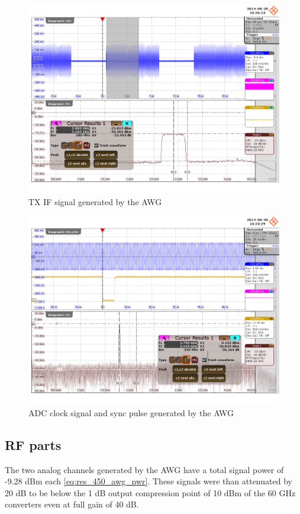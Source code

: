 \begin{figure}[p]
  \centering
  \includegraphics[width=\textwidth]{figures/osci/res_450_awg_analog}
  \caption{\gls{TX} \gls{IF} signal generated by the \gls{AWG}}
  \label{fig:res_450_awg_analog}
\end{figure}

\begin{figure}[p]
  \centering
  \includegraphics[width=\textwidth]{figures/osci/res_450_awg_digital}
  \caption{\gls{ADC} clock signal and sync pulse generated by the \gls{AWG}}
  \label{fig:res_450_awg_digital}
\end{figure}

\subsection{RF parts}
The two analog channels generated by the \gls{AWG} have a total signal
power of -9.28 dBm each \eqref{eq:res_450_awg_pwr}. These signals were
than attenuated by 20 dB to be below the 1 dB output compression point of 10 dBm
of the 60 GHz converters even at full gain of 40 dB. \\

